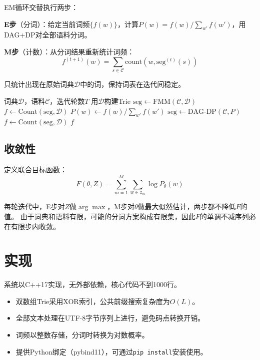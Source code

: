 \documentclass[11pt,a4paper]{article}
\begin{document}
EM循环交替执行两步：

\textbf{E步}（分词）：给定当前词频$\{f(w)\}$，计算$P(w) = f(w) / \sum_{w'} f(w')$，用DAG+DP对全部语料分词。

\textbf{M步}（计数）：从分词结果重新统计词频：
\begin{equation}
    f^{(t+1)}(w) = \sum_{s \in \mathcal{C}} \text{count}(w, \text{seg}^{(t)}(s))
\end{equation}

只统计出现在原始词典$\mathcal{D}$中的词，保持词表在迭代间稳定。

\begin{algorithm}[t]
\caption{基于固定词典的EM分词算法}
\begin{algorithmic}[1]
\REQUIRE 词典$\mathcal{D}$，语料$\mathcal{C}$，迭代轮数$T$
\STATE 用$\mathcal{D}$构建Trie
\STATE $\text{seg} \leftarrow \text{FMM}(\mathcal{C}, \mathcal{D})$ 
\STATE $f \leftarrow \text{Count}(\text{seg}, \mathcal{D})$ 
    \STATE $P(w) \leftarrow f(w) / \sum_{w'} f(w')$
    \STATE $\text{seg} \leftarrow \text{DAG-DP}(\mathcal{C}, P)$ 
    \STATE $f \leftarrow \text{Count}(\text{seg}, \mathcal{D})$ 
\ENDFOR
\RETURN $f$
\end{algorithmic}
\end{algorithm}

\subsection{收敛性}

定义联合目标函数：
\begin{equation}
    F(\theta, Z) = \sum_{m=1}^{M} \sum_{w \in z_m} \log P_\theta(w)
\end{equation}

每轮迭代中，E步对$Z$做$\arg\max$，M步对$\theta$做最大似然估计，两步都不降低$F$的值。
由于词典和语料有限，可能的分词方案构成有限集，因此$F$的单调不减序列必在有限步内收敛。

\section{实现}

系统以C++17实现，无外部依赖，核心代码不到1000行。

\begin{itemize}
    \item 双数组Trie采用XOR索引，公共前缀搜索复杂度为$O(L)$。
    \item 全部文本处理在UTF-8字节序列上进行，避免码点转换开销。
    \item 词频以整数存储，分词时转换为对数概率。
    \item 提供Python绑定（pybind11），可通过\texttt{pip install}安装使用。
\end{itemize}
\end{document}
